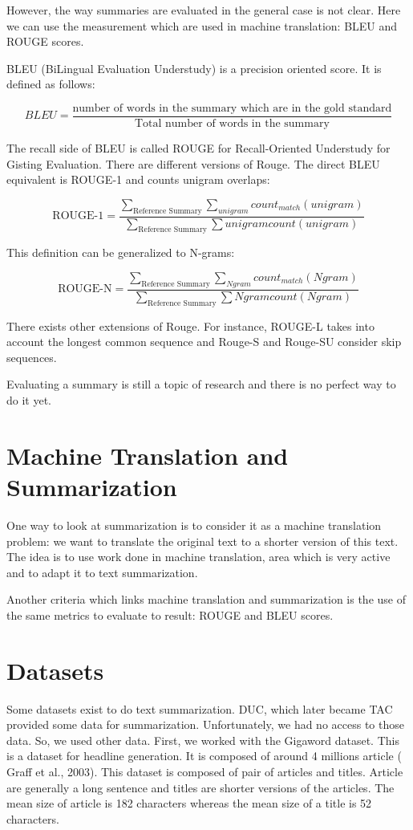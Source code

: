 \documentclass[11pt,a4paper,oldfontcommands]{memoir}
\begin{document}
However, the way summaries are evaluated in the general case is not clear. Here we can use the measurement which are used in machine translation: BLEU and ROUGE scores.

BLEU (BiLingual Evaluation Understudy) is a precision oriented score. It is defined as follows:

\[BLEU = \frac{\text{number of words in the summary which are in the gold standard}}{\text{Total number of words in the summary}}\]

The recall side of BLEU is called ROUGE for Recall-Oriented Understudy for Gisting Evaluation. There are different versions of Rouge. The direct BLEU equivalent is ROUGE-1 and counts unigram overlaps:


\[\text{ROUGE-1} = \frac{\sum_{\text{Reference Summary}} \sum_{unigram} count_{match}(unigram)}{\sum_{\text{Reference Summary}} \sum{unigram} count(unigram)}\]


This definition can be generalized to N-grams:

\[\text{ROUGE-N} = \frac{\sum_{\text{Reference Summary}} \sum_{Ngram} count_{match}(Ngram)}{\sum_{\text{Reference Summary}} \sum{Ngram} count(Ngram)}\]

There exists other extensions of Rouge. For instance, ROUGE-L takes into account the longest common sequence and Rouge-S and Rouge-SU consider skip sequences.

Evaluating a summary is still a topic of research and there is no perfect way to do it yet.

\section{Machine Translation and Summarization}

One way to look at summarization is to consider it as a machine translation problem: we want to translate the original text to a shorter version of this text. The idea is to use work done in machine translation, area which is very active and to adapt it to text summarization.

Another criteria which links machine translation and summarization is the use of the same metrics to evaluate to result: ROUGE and BLEU scores.

\section{Datasets}

Some datasets exist to do text summarization. DUC, which later became TAC provided some data for summarization. Unfortunately, we had no access to those data. So, we used other data.
First, we worked with the Gigaword dataset. This is a dataset for headline generation. It is composed of around 4 millions article (\cite{Graff03} Graff et al., 2003). This dataset is composed of pair of articles and titles. Article are generally a long sentence and titles are shorter versions of the articles. The mean size of article is 182 characters whereas the mean size of a title is 52 characters.
\end{document}
